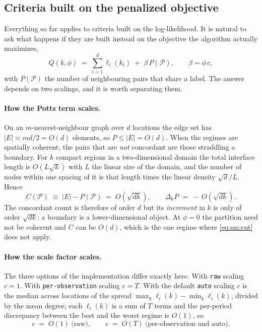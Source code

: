 \documentclass[11pt]{article}
\begin{document}
\subsection{Criteria built on the penalized objective}\label{sm:ic:pen}

Everything so far applies to criteria built on the log-likelihood. It is natural to ask what happens if they are built instead on the objective the algorithm actually maximizes,
\begin{equation}\label{eq:sm:Q}
  Q(k,\phi) \;=\; \sum_{i=1}^{d} \ell_i(k_i) \;+\; \beta\, P(\mathcal{P}),
  \qquad \beta = \phi\, c,
\end{equation}
with $P(\mathcal{P})$ the number of neighbouring pairs that share a label. The answer depends on two scalings, and it is worth separating them.

\paragraph{How the Potts term scales.} On an $m$-nearest-neighbour graph over $d$ locations the edge set has $|E| \asymp md/2 = O(d)$ elements, so $P \le |E| = O(d)$. When the regimes are spatially coherent, the pairs that are \emph{not} concordant are those straddling a boundary. For $k$ compact regions in a two-dimensional domain the total interface length is $O(L\sqrt{k})$ with $L$ the linear size of the domain, and the number of nodes within one spacing of it is that length times the linear density $\sqrt{d}/L$. Hence
\begin{equation}\label{eq:sm:cut}
  C(\mathcal{P}) \;\equiv\; |E| - P(\mathcal{P}) \;=\; O\!\left(\sqrt{dk}\right),
  \qquad
  \Delta_k P \;=\; -\,O\!\left(\sqrt{dk}\right).
\end{equation}
The concordant count is therefore of order $d$ but its \emph{increment} in $k$ is only of order $\sqrt{dk}$: a boundary is a lower-dimensional object. At $\phi = 0$ the partition need not be coherent and $C$ can be $O(d)$, which is the one regime where \eqref{eq:sm:cut} does not apply.

\paragraph{How the scale factor scales.} The three options of the implementation differ exactly here. With \texttt{raw} scaling $c = 1$. With \texttt{per-observation} scaling $c = T$. With the default \texttt{auto} scaling $c$ is the median across locations of the spread $\max_k \ell_i(k) - \min_k \ell_i(k)$, divided by the mean degree; each $\ell_i(k)$ is a sum of $T$ terms and the per-period discrepancy between the best and the worst regime is $O(1)$, so
\begin{equation}\label{eq:sm:cscale}
  c \;=\; O(1) \ \text{(raw)}, \qquad c \;=\; O(T) \ \text{(per-observation and auto)} .
\end{equation}
\end{document}
